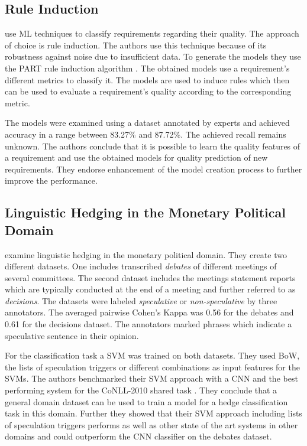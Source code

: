 \subsection{Rule Induction}
\textcite{Parra:2015} use \ac{ML} techniques to classify requirements regarding their quality.
The approach of choice is rule induction.
The authors use this technique because of its robustness against noise due to insufficient data.
To generate the models they use the PART rule induction algorithm \parencite{Eibe:1998}.
The obtained models use a requirement's different metrics to classify it.
The models are used to induce rules which then can be used to evaluate a requirement's quality according to the corresponding metric.

The models were examined using a dataset annotated by experts and achieved accuracy in a range between 83.27\% and 87.72\%.
The achieved recall remains unknown.
The authors conclude that it is possible to learn the quality features of a requirement and use the obtained models for quality prediction of new requirements.
They endorse enhancement of the model creation process to further improve the performance.

\subsection{Linguistic Hedging in the Monetary Political Domain}
\textcite{Stajner:2017} examine linguistic hedging in the monetary political domain.
They create two different datasets.
One includes transcribed \textit{debates} of different meetings of several committees.
The second dataset includes the meetings statement reports which are typically conducted at the end of a meeting and further referred to as \textit{decisions}.
The datasets were labeled \textit{speculative} or \textit{non-speculative} by three annotators.
The averaged pairwise Cohen's Kappa \parencite{Cohen:1960} was 0.56 for the debates and 0.61 for the decisions dataset.
The annotators marked phrases which indicate a speculative sentence in their opinion.

For the classification task a \ac{SVM} was trained on both datasets.
They used \ac{BoW}, the lists of speculation triggers or different combinations as input features for the \acp{SVM}.
The authors benchmarked their \ac{SVM} approach with a \ac{CNN} and the best performing system for the CoNLL-2010 shared task \parencite{Farkas:2010}.
They conclude that a general domain dataset can be used to train a model for a hedge classification task in this domain.
Further they showed that their \ac{SVM} approach including lists of speculation triggers performs as well as other state of the art systems in other domains and could outperform the \ac{CNN} classifier on the debates dataset.

